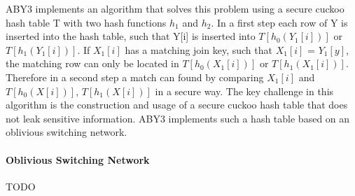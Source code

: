 ABY3 implements an algorithm that solves this problem using a secure cuckoo hash table T with two hash functions $ h_1 $ and $h_2$. 
In a first step each row of Y is inserted into the hash table, such that Y[i] is inserted into $ T[h_0(Y_1 [i]  )] $ or $T[h_1(Y_1 [i]  )] $. 
If $X_1[i]$ has a matching join key, such that  $X_1[i]$ = $Y_1[y]$,  the matching row can only be located in $ T[h_0(X_1[i])] $ or  $T[h_1( X_1[i])] $. 
Therefore in a second step a match can found by comparing $X_1[i]$ and $ T[h_0(X[i])] $,  $T[h_1(X[i])] $ in a secure way. The key challenge in this algorithm is the construction and usage of a secure cuckoo hash table that does not leak sensitive information. ABY3 implements such a hash table based on an oblivious switching network.
\paragraph{Oblivious Switching Network}
TODO









\




